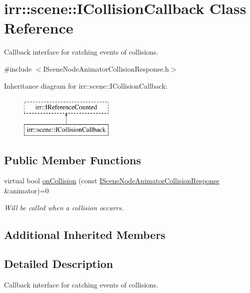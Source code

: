 \hypertarget{classirr_1_1scene_1_1ICollisionCallback}{}\section{irr\+:\+:scene\+:\+:I\+Collision\+Callback Class Reference}
\label{classirr_1_1scene_1_1ICollisionCallback}


Callback interface for catching events of collisions.  




{\ttfamily \#include $<$I\+Scene\+Node\+Animator\+Collision\+Response.\+h$>$}

Inheritance diagram for irr\+:\+:scene\+:\+:I\+Collision\+Callback\+:\begin{figure}[H]
\begin{center}
\leavevmode
\includegraphics[height=2.000000cm]{classirr_1_1scene_1_1ICollisionCallback}
\end{center}
\end{figure}
\subsection*{Public Member Functions}
\begin{DoxyCompactItemize}
\item 
virtual bool \hyperlink{classirr_1_1scene_1_1ICollisionCallback_a35791df17defc6fd301dccef1cae596a}{on\+Collision} (const \hyperlink{classirr_1_1scene_1_1ISceneNodeAnimatorCollisionResponse}{I\+Scene\+Node\+Animator\+Collision\+Response} \&animator)=0
\begin{DoxyCompactList}\small\item\em Will be called when a collision occurrs. \end{DoxyCompactList}\end{DoxyCompactItemize}
\subsection*{Additional Inherited Members}


\subsection{Detailed Description}
Callback interface for catching events of collisions. 

